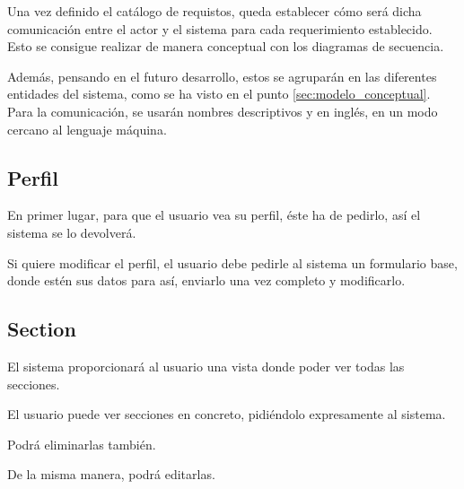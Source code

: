 Una vez definido el catálogo de requistos, queda establecer cómo será dicha comunicación entre el actor y el sistema para cada requerimiento establecido. Esto se consigue realizar de manera conceptual con los diagramas de secuencia.

Además, pensando en el futuro desarrollo, estos se agruparán en las diferentes entidades del sistema, como se ha visto en el punto \ref{sec:modelo_conceptual}. Para la comunicación, se usarán nombres descriptivos y en inglés, en un modo cercano al lenguaje máquina.

\subsection{Perfil}
En primer lugar, para que el usuario vea su perfil, éste ha de pedirlo, así el sistema se lo devolverá.


\newpage

Si quiere modificar el perfil, el usuario debe pedirle al sistema un formulario base, donde estén sus datos para así, enviarlo una vez completo y modificarlo.


\newpage

\subsection{Section}
El sistema proporcionará al usuario una vista donde poder ver todas las secciones.


\newpage
El usuario puede ver secciones en concreto, pidiéndolo expresamente al sistema.


\newpage
Podrá eliminarlas también.


De la misma manera, podrá editarlas.

